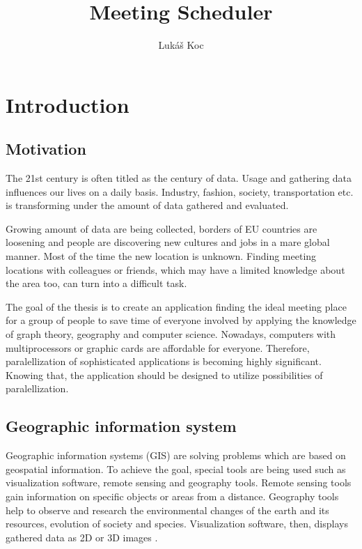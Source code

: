\documentclass[thesis=M,english]{FITthesis}[2012/10/20]
\title{Meeting Scheduler}
\author{Luk{\' a}{\v s} Koc} %
\begin{document}

\chapter{Introduction}

\section{Motivation}
The 21st century is often titled as the century of data. Usage and gathering data influences our lives on a daily basis. Industry, fashion, society, transportation etc. is transforming under the amount of data gathered and evaluated. 

Growing amount of data are being collected, borders of EU countries are loosening and people are discovering new cultures and jobs in a mare global manner. Most of the time the new location is unknown. Finding meeting locations with colleagues or friends, which may have a limited knowledge about the area too, can turn into a difficult task.

The goal of the thesis is to create an application finding the ideal meeting place for a group of people to save time of everyone involved by applying the knowledge of graph theory, geography and computer science.
Nowadays, computers with multiprocessors or graphic cards are affordable for everyone. Therefore, paralellization of sophisticated applications is becoming highly significant. Knowing that, the application should be designed to utilize possibilities of paralellization.

\section{Geographic information system}
Geographic information systems (GIS) are solving problems which are based on geospatial information. To achieve the goal, special tools are being used such as visualization software, remote sensing and geography tools. Remote sensing tools gain information on specific objects or areas from a distance. Geography tools help to observe and research the environmental changes of the earth and its resources, evolution of society and species. Visualization software, then, displays gathered data as 2D or 3D images \cite{Chen10}.
\end{document}
